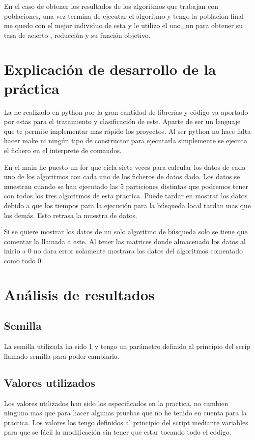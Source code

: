 \documentclass[titlepage]{article}
\begin{document}
	En el caso de obtener los resultados de los algoritmos que trabajan con poblaciones, una vez termina de ejecutar el algoritmo y tengo la poblacion final me quedo con el mejor individuo de esta y le utilizo el uno\_nn para obtener su tasa de acierto , reducción y su función objetivo. 
	
	
	\newpage
	
	\section{Explicación de desarrollo de la práctica}
	La he realizado en python por la gran cantidad de librerías y código ya aportado por estas para el tratamiento y clasificación de este.
	Aparte de ser un lenguaje que te permite implementar mas rápido los proyectos.
	Al ser python no hace falta hacer make ni ningún tipo de constructor para ejecutarla simplemente se ejecuta el fichero en el interprete de comandos.
	
	En el main he puesto un for que cicla siete veces para calcular los datos de cada uno de los algoritmos con cada uno de los ficheros de datos dado. Los datos se muestran cuando se han ejecutado las 5 particiones distintas que podremos tener con todos los tres algoritmos de esta practica. Puede tardar en mostrar los datos debido a que los tiempos para la ejecución para la búsqueda local tardan mas que los demás. Esto retrasa la muestra de datos.
	
	Si se quiere mostrar los datos de un solo algoritmo de búsqueda solo se tiene que comentar la llamada a este. Al tener las matrices donde almacenado los datos al inicio a 0 no dara error solamente mostrara los datos del algoritmos comentado como todo 0.
	\section{Análisis de resultados}
	\subsection{Semilla}
	La semilla utilizada ha sido 1 y tengo un parámetro definido al principio del scrip llamado semilla para poder cambiarlo.
	
	\subsection{Valores utilizados}	
	Los valores utilizados han sido los especificados en la practica, no cambien ninguno mas que para hacer algunas pruebas que no he tenido en cuenta para la practica. Los valores los tengo definidos al principio del script mediante variables para que se fácil la modificación sin tener que estar tocando todo el código.
	\newpage
\end{document}
